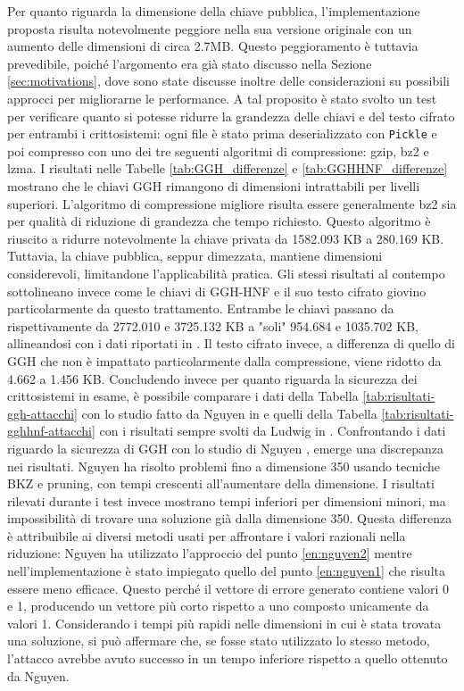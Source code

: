 Per quanto riguarda la dimensione della chiave pubblica, l'implementazione proposta risulta
notevolmente peggiore nella sua versione originale con un aumento delle dimensioni di 
circa 2.7MB. Questo peggioramento è tuttavia prevedibile, poiché l'argomento era già 
stato discusso nella Sezione \ref{sec:motivations}, dove sono state discusse inoltre delle 
considerazioni su possibili approcci per migliorarne le performance. A tal proposito è
stato svolto un test per verificare quanto si potesse ridurre la grandezza delle chiavi e 
del testo cifrato per entrambi i crittosistemi: ogni file è stato prima deserializzato con 
\texttt{Pickle} e poi compresso con uno dei tre seguenti algoritmi di compressione: 
gzip, bz2 e lzma. 
I risultati nelle Tabelle \ref{tab:GGH_differenze} e \ref{tab:GGHHNF_differenze} mostrano 
che le chiavi GGH rimangono di dimensioni intrattabili per livelli superiori. 
L'algoritmo di compressione migliore risulta essere generalmente bz2 sia per qualità di 
riduzione di grandezza che tempo richiesto. 
Questo algoritmo è riuscito a ridurre notevolmente la chiave privata da 1582.093 KB a 
280.169 KB. Tuttavia, la chiave pubblica, seppur dimezzata, mantiene dimensioni 
considerevoli, limitandone l'applicabilità pratica. Gli stessi risultati al contempo 
sottolineano invece come le chiavi di GGH-HNF e il suo testo cifrato giovino 
particolarmente da questo trattamento. Entrambe le chiavi passano da rispettivamente da
2772.010 e 3725.132 KB a "soli" 954.684 e 1035.702 KB, allineandosi con i dati riportati in 
\cite{HNF04}. Il testo cifrato invece, a differenza di quello di GGH che non è impattato 
particolarmente dalla compressione, viene ridotto da 4.662 a 1.456 KB. 
Concludendo invece per quanto riguarda la sicurezza dei crittosistemi in esame, è possibile
comparare i dati della Tabella \ref{tab:risultati-ggh-attacchi} con lo studio fatto da
Nguyen in \cite{Nguyen99} e quelli della Tabella \ref{tab:risultati-gghhnf-attacchi} con 
i risultati sempre svolti da Ludwig in \cite{HNF04}. 
Confrontando i dati riguardo la sicurezza di GGH con lo studio di Nguyen \cite{Nguyen99}, 
emerge una discrepanza nei risultati. Nguyen ha risolto problemi fino a dimensione 
350 usando tecniche BKZ e pruning, con tempi crescenti all'aumentare della dimensione.
I risultati rilevati durante i test invece mostrano tempi inferiori per dimensioni minori, 
ma impossibilità di trovare una soluzione già dalla dimensione 350.
Questa differenza è attribuibile ai diversi metodi usati per affrontare i valori 
razionali nella riduzione: Nguyen ha utilizzato l'approccio del punto \ref{en:nguyen2} 
mentre nell'implementazione è stato impiegato quello del punto \ref{en:nguyen1} che risulta 
essere meno efficace. Questo perché il vettore di errore generato contiene valori 0 e 1, 
producendo un vettore più corto rispetto a uno composto unicamente da valori 1. 
Considerando i tempi più rapidi nelle dimensioni in cui è stata trovata una soluzione, 
si può affermare che, se fosse stato utilizzato lo stesso metodo, l'attacco avrebbe avuto 
successo in un tempo inferiore rispetto a quello ottenuto da Nguyen. 

